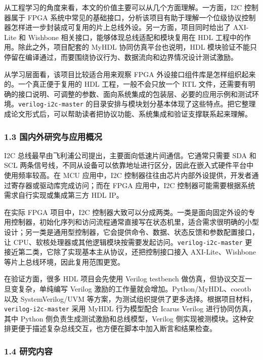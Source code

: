 从工程学习的角度来看，本文的价值主要可以从几个方面理解。一方面，I2C 控制器属于 FPGA 系统中常见的基础接口，分析该项目有助于理解一个位级协议控制器怎样进一步封装成可复用的片上总线外设。另一方面，项目同时给出了 AXI-Lite 和 Wishbone 相关接口，能够体现总线适配和模块复用在 HDL 工程中的作用。除此之外，项目配套的 MyHDL 协同仿真平台也说明，HDL 模块验证不能只停留在编译通过，而要围绕协议行为、数据流向和边界情况设计测试激励。

从学习层面看，该项目比较适合用来观察 FPGA 外设接口组件库是怎样组织起来的。一个真正便于复用的 HDL 工程，一般不会只放一个 RTL 文件，还需要有明确的接口说明、可调整的参数、面向系统集成的包装层、必要的应用示例和测试环境。\texttt{verilog-i2c-master} 的目录安排与模块划分基本体现了这些特点。把它整理成论文形式后，可以帮助读者把协议功能、系统集成和验证支撑联系起来理解。

\subsubsection{1.3 国内外研究与应用概况}\label{ux56fdux5185ux5916ux7814ux7a76ux4e0eux5e94ux7528ux6982ux51b5}

I2C 总线最早由飞利浦公司提出，主要面向低速片间通信。它通常只需要 SDA 和 SCL 两条信号线，不同从设备可以依靠地址进行区分，因此在嵌入式硬件平台中使用频率较高。在 MCU 应用中，I2C 控制器往往由芯片内部外设提供，开发者通过寄存器或驱动库完成访问；而在 FPGA 应用中，I2C 控制器可能需要根据系统需求自行实现或集成第三方 HDL IP。

在实际 FPGA 项目中，I2C 控制器大致可以分成两类。一类是面向固定外设的专用控制器，初始化序列和访问流程通常直接写在状态机里，适合需求很明确的小型设计；另一类是通用型控制器，它会提供命令、数据、状态反馈和参数配置接口，让 CPU、软核处理器或其他逻辑模块按需要发起访问。\texttt{verilog-i2c-master} 更接近第二类，它除了实现基本主从协议，还把控制接口接入 AXI-Lite、Wishbone 等片上总线环境，因此复用范围更宽。

在验证方面，很多 HDL 项目会先使用 Verilog testbench 做仿真，但协议交互一旦变复杂，单纯编写 Verilog 激励的工作量就会增加。Python/MyHDL、cocotb 以及 SystemVerilog/UVM 等方案，为测试组织提供了更多选择。根据项目材料，\texttt{verilog-i2c-master} 采用 MyHDL 行为模型配合 Icarus Verilog 进行协同仿真，其中 Python 侧负责生成测试激励和总线模型，Verilog 侧实现被测模块。这种安排更便于描述复杂总线交互，也方便在脚本中加入断言和结果检查。

\subsubsection{1.4 研究内容}\label{ux7814ux7a76ux5185ux5bb9}

